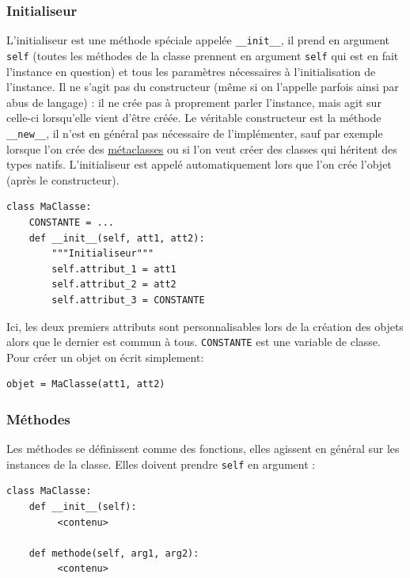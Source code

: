 \documentclass[a4paper, 10pt]{article}
\newcommand{\code}[1]{{\small\texttt{#1}}}
\begin{document}
\subsubsection{Initialiseur}\index{\code{\_\_init\_\_}}

L'initialiseur est une méthode spéciale appelée {\footnotesize\verb|__init__|}, il prend en argument \code{self}\index{\code{self}} (toutes les méthodes de la classe prennent en argument \code{self} qui est en fait l'instance en question) et tous les paramètres nécessaires à l'initialisation de l'instance. Il ne s'agit pas du constructeur (même si on l'appelle parfois ainsi par abus de langage) : il ne crée  pas à proprement parler l'instance, mais agit sur celle-ci lorsqu'elle vient d'être créée. Le \og véritable \fg{} constructeur est la méthode \code{\_\_new\_\_}, il n'est en général pas nécessaire de l'implémenter, sauf par exemple lorsque l'on crée des \hyperref[sec:metaclasses]{métaclasses} ou si l'on veut créer des classes qui héritent des types natifs. L'initialiseur est appelé automatiquement lors que l'on crée l'objet (après le constructeur).
\begin{verbatim}
class MaClasse:
    CONSTANTE = ...
    def __init__(self, att1, att2):
        """Initialiseur"""
        self.attribut_1 = att1
        self.attribut_2 = att2
        self.attribut_3 = CONSTANTE
\end{verbatim}
Ici, les deux premiers attributs sont personnalisables lors de la création des objets alors que le dernier est commun à tous. \code{CONSTANTE} est une variable de classe. Pour créer un objet on écrit simplement:
\begin{verbatim}
objet = MaClasse(att1, att2)
\end{verbatim}

\subsubsection{Méthodes}
Les méthodes se définissent comme des fonctions, elles agissent en général sur les instances de la classe. Elles doivent prendre \code{self} en argument :
\begin{verbatim}
class MaClasse:
    def __init__(self):
         <contenu>

    def methode(self, arg1, arg2):
         <contenu>
\end{verbatim}
\end{document}
